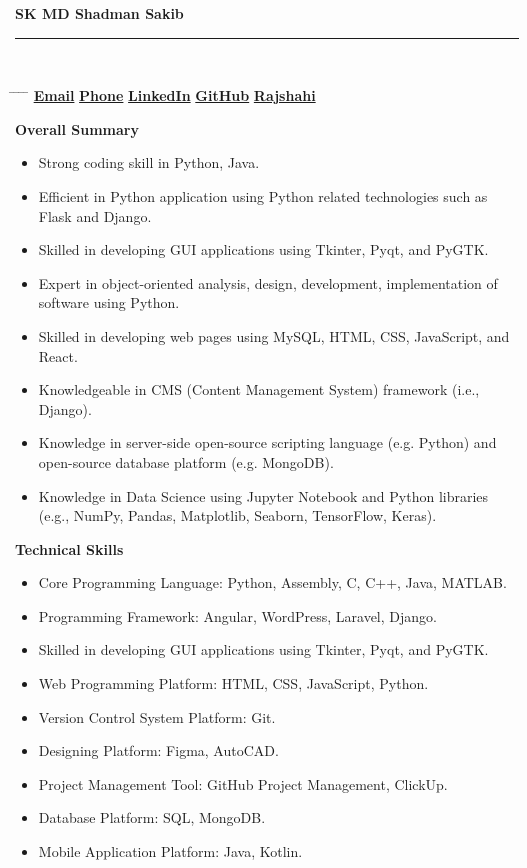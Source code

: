 \documentclass[a4paper,10pt]{article}
\makeatletter
\newcommand{\namesection}[2]{
    \centering
    {\Huge \textbf{\fontseries{b}\selectfont #1}}\\[0.5em]  %
    \noindent\rule{\linewidth}{1pt}  %
    \\[1em]
    \noindent
    \begin{tabbing}
        \hspace{3em} \= \hspace{1em} \= \hspace{1em} \= \hspace{1em} \= \kill 
        \> \href{mailto:skmdshadmansakib@gmail.com}{\textbf{Email}} \hspace{2em} \= \textbf{\vrule height 3ex width 1pt} \hspace{2em} \=
        \href{tel:+8801768801100}{\textbf{Phone}} \hspace{2em} \= \textbf{\vrule height 3ex width 1pt} \hspace{2em} \=
        \href{https://linkedin.com/in/skmdshadmansakib}{\textbf{LinkedIn}} \hspace{2em} \= \textbf{\vrule height 3ex width 1pt} \hspace{2em} \=
        \href{https://github.com/shadmans804}{\textbf{GitHub}} \hspace{2em} \= \textbf{\vrule height 3ex width 1pt} \hspace{2em} \=
        \href{https://maps.app.goo.gl/yw34AmPq6qC1ZqJu8}{\textbf{Rajshahi}} \hspace{2em} \\
    \end{tabbing}
}
\makeatother
\begin{document}
\namesection{\textbf{SK MD Shadman Sakib}}{}



\begin{tcolorbox}[colback=white, colframe=black, arc=3mm, boxrule=0.5mm, width=\textwidth]
    {\Large \textbf{Overall Summary}}
\end{tcolorbox}

\begin{itemize}
    \item {Strong coding skill in Python, Java.}
    \item {Efficient in Python application using Python related technologies such as Flask and Django.}
    \item {Skilled in developing GUI applications using Tkinter, Pyqt, and PyGTK.}
    \item {Expert in object-oriented analysis, design, development, implementation of software using Python.}
    \item {Skilled in developing web pages using MySQL, HTML, CSS, JavaScript, and React.}
    \item {Knowledgeable in CMS (Content Management System) framework (i.e., Django).}
    \item {Knowledge in server-side open-source scripting language (e.g. Python) and open-source database platform (e.g. MongoDB).}
    \item {Knowledge in Data Science using Jupyter Notebook and Python libraries (e.g., NumPy, Pandas, Matplotlib, Seaborn, TensorFlow, Keras).}
\end{itemize}

\hspace{1cm}

\begin{tcolorbox}[colback=white, colframe=black, arc=3mm, boxrule=0.5mm, width=\textwidth]
    {\Large \textbf{Technical Skills}}
\end{tcolorbox}

\begin{itemize}
    \item {Core Programming Language: Python, Assembly, C, C++, Java, MATLAB.}
    \item {Programming Framework: Angular, WordPress, Laravel, Django.}
    \item {Skilled in developing GUI applications using Tkinter, Pyqt, and PyGTK.}
    \item {Web Programming Platform: HTML, CSS, JavaScript, Python.}
    \item {Version Control System Platform: Git.}
    \item {Designing Platform: Figma, AutoCAD.}
    \item {Project Management Tool: GitHub Project Management, ClickUp.}
    \item {Database Platform: SQL, MongoDB.}
    \item {Mobile Application Platform: Java, Kotlin.}
\end{itemize}
\end{document}
